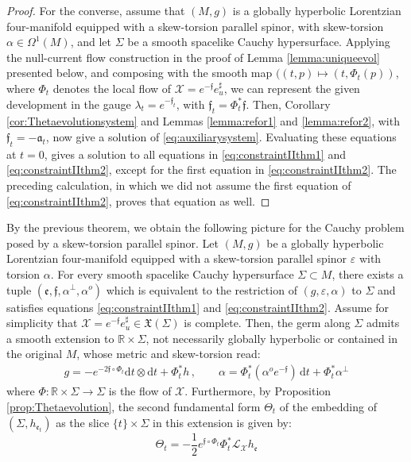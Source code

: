 \documentclass[10pt,reqno,a4paper]{amsart}
\theoremstyle{plain}
\theoremstyle{definition}
\theoremstyle{remark}
\theoremstyle{remark}
\def\dd{\mathrm{d}}
\def\cL{\mathcal{L}}
\def\cX{\mathcal{X}}
\def\cL{\mathcal{L}}
\def\fra{\mathfrak{a}}
\def\fre{\mathfrak{e}}
\renewcommand{\(}{ (}
\renewcommand{\)}{ )}
\newcommand{\frf}{\mathfrak{f}}
\begin{document}
\begin{proof}
\noindent
For the converse, assume that $(M,g)$ is a globally hyperbolic Lorentzian four-manifold equipped with a skew-torsion parallel spinor, with skew-torsion $\alpha\in\Omega^1(M)$, and let $\Sigma$ be a smooth spacelike Cauchy hypersurface. Applying the null-current flow construction in the proof of Lemma \ref{lemma:uniqueevol} presented below, and composing with the smooth map $((t,p)\mapsto(t,\Phi_t(p))$, where $\Phi_t$ denotes the local flow of $\cX=e^{-\frf}e_u^\sharp$, we can represent the given development in the gauge $\lambda_t=e^{-\frf_t}$, with $\frf_t=\Phi_t^*\frf$. Then, Corollary \ref{cor:Thetaevolutionsystem} and Lemmas \ref{lemma:refor1} and \ref{lemma:refor2}, with $\frf_t=-\fra_t$, now give a solution of \eqref{eq:auxiliarysystem}. Evaluating these equations at $t=0$, gives a solution to all equations in \eqref{eq:constraintIIthm1} and \eqref{eq:constraintIIthm2}, except for the first equation in \eqref{eq:constraintIIthm2}. The preceding calculation, in which we did not assume the first equation of \eqref{eq:constraintIIthm2}, proves that equation as well.
\end{proof} 

\noindent
By the previous theorem, we obtain the following picture for the Cauchy problem posed by a skew-torsion parallel spinor. Let $(M,g)$ be a globally hyperbolic Lorentzian four-manifold equipped with a skew-torsion parallel spinor $\varepsilon$ with torsion $\alpha$. For every smooth spacelike Cauchy hypersurface $\Sigma \subset M$, there exists a tuple $(\fre,\frf,\alpha^{\perp},\alpha^o)$ which is equivalent to the restriction of $(g,\varepsilon,\alpha)$ to $\Sigma$ and satisfies equations \eqref{eq:constraintIIthm1} and \eqref{eq:constraintIIthm2}. Assume for simplicity that $\cX = e^{-\frf} e^{\sharp}_u \in \mathfrak{X}(\Sigma)$ is complete. Then, the germ along $\Sigma$ admits a smooth extension to $\mathbb{R}\times\Sigma$, not necessarily globally hyperbolic or contained in the original $M$, whose metric and skew-torsion read:
\begin{eqnarray*}
g = - e^{- 2 \frf \circ \Phi_t} \dd t \otimes \dd t + \Phi^{\ast}_t h\, , \qquad \alpha = \Phi^{\ast}_t (\alpha^o e^{-\frf})\,\dd t + \Phi^{\ast}_t\alpha^{\perp} 
\end{eqnarray*}
where $\Phi\colon \mathbb{R}\times \Sigma \to \Sigma$ is the flow of $\cX$. Furthermore, by Proposition \ref{prop:Thetaevolution}, the second fundamental form $\Theta_t$ of the embedding of $(\Sigma,h_{\fre_t})$ as the slice $\{t\}\times\Sigma$ in this extension is given by:
\begin{equation*}
\Theta_t = - \frac{1}{2} e^{\frf \circ \Phi_t} \Phi_t^{\ast} \cL_{\cX}h_{\fre}
\end{equation*}
\end{document}
